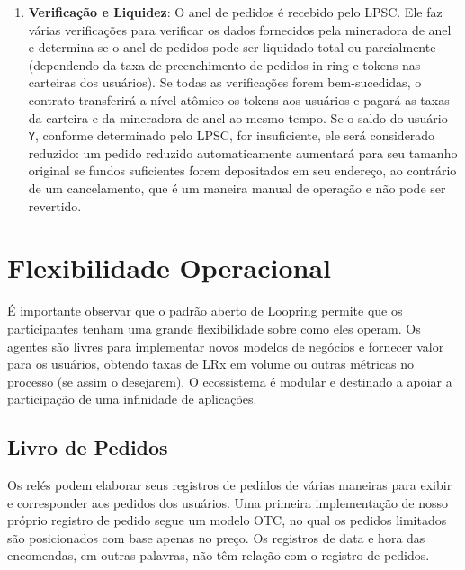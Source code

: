 \documentclass[UTF8,nofonts]{article}
\makeatletter
\newenvironment{figurehere}
 {\def\@captype{figure}}
 {}
\makeatother
\begin{document}
\begin{multicols}{2}
\begin{enumerate}
\item \textbf{Verificação e Liquidez}: O anel de pedidos é recebido pelo LPSC. Ele faz várias verificações para verificar os dados fornecidos pela mineradora de anel e determina se o anel de pedidos pode ser liquidado total ou parcialmente (dependendo da taxa de preenchimento de pedidos in-ring e tokens nas carteiras dos usuários). Se todas as verificações forem bem-sucedidas, o contrato transferirá a nível atômico os tokens aos usuários e pagará as taxas da carteira e da mineradora de anel ao mesmo tempo. Se o saldo do usuário \verb|Y|, conforme determinado pelo LPSC, for insuficiente, ele será considerado reduzido: um pedido reduzido automaticamente aumentará para seu tamanho original se fundos suficientes forem depositados em seu endereço, ao contrário de um cancelamento, que é um maneira manual de operação e não pode ser revertido.

\end{enumerate}

%
%
%

\section{Flexibilidade Operacional\label{sec:business_model}}
É importante observar que o padrão aberto de Loopring permite que os participantes tenham uma grande flexibilidade sobre como eles operam. Os agentes são livres para implementar novos modelos de negócios e fornecer valor para os usuários, obtendo taxas de LRx em volume ou outras métricas no processo (se assim o desejarem). O ecossistema é modular e destinado a apoiar a participação de uma infinidade de aplicações.


\subsection{Livro de Pedidos\label{sec:order_book}}
Os relés podem elaborar seus registros de pedidos de várias maneiras para exibir e corresponder aos pedidos dos usuários. Uma primeira implementação de nosso próprio registro de pedido segue um modelo OTC, no qual os pedidos limitados são posicionados com base apenas no preço. Os registros de data e hora das encomendas, em outras palavras, não têm relação com o registro de pedidos.


\end{multicols}
\end{document}
